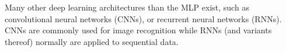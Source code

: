 

Many other deep learning architectures than the MLP exist, such as convolutional neural networks (CNNs), or recurrent neural networks (RNNs). CNNs are commonly used for image recognition while RNNs (and variants thereof) normally are applied to sequential data. 

